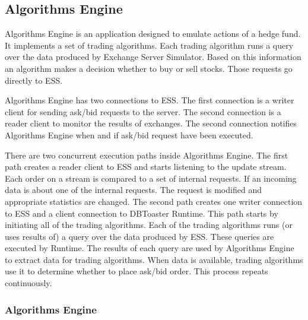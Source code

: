 \documentclass[14pt]{article}
\begin{document}
\subsection{Algorithms Engine}

Algorithms Engine is an application designed to emulate actions of a hedge fund. It implements a set of trading algorithms. Each trading algorithm runs a query over the data produced by Exchange Server Simulator. Based on this information an algorithm makes a decision whether to buy or sell stocks. Those requests go directly to ESS. 

Algorithms Engine has two connections to ESS. The first connection is a writer client for sending ask/bid requests to the server. The second connection is a reader client to monitor the results of exchanges. The second connection notifies Algorithms Engine when and if ask/bid request have been executed. 

There are two concurrent execution paths inside Algorithms Engine. The first path creates a reader client to ESS and starts listening to the update stream. Each order on a stream is compared to a set of internal requests. If an incoming data is about one of the internal requests. The request is modified and appropriate statistics are changed. The second path creates one writer connection to ESS and a client connection to DBToaster Runtime. This path starts by initiating all of the trading algorithms. Each of the trading algorithms runs (or uses results of) a query over the data produced by ESS. These queries are executed by Runtime. The results of each query are used by Algorithms Engine to extract data for trading algorithms. When data is available, trading algorithms use it to determine whether to place ask/bid order. This process repeats continuously. 



\subsubsection{Algorithms Engine}
\end{document}
